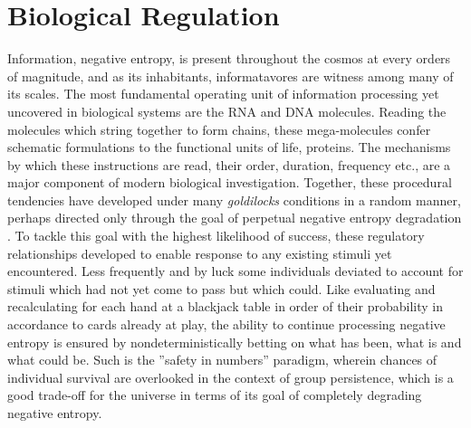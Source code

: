 
\section{Biological Regulation}
\label{sec:bioreg}
Information, \ie negative entropy, is present throughout the cosmos at every orders of magnitude, and as its inhabitants, informatavores are witness among many of its scales. The most fundamental operating unit of information processing yet uncovered in biological systems are the RNA and DNA molecules. Reading the molecules which string together to form chains, these mega-molecules confer schematic formulations to the functional units of life, proteins. The mechanisms by which these instructions are read, \ie their order, duration, frequency etc., are a major component of modern biological investigation. Together, these procedural tendencies have developed under many \emph{goldilocks} conditions in a random manner, perhaps directed only through the goal of perpetual negative entropy degradation \citep{england2013statistical}. To tackle this goal with the highest likelihood of success, these regulatory relationships developed to enable response to any existing stimuli yet encountered. Less frequently and by luck some individuals deviated to account for stimuli which had not yet come to pass but which could. Like evaluating and recalculating for each hand at a blackjack table in order of their probability in accordance to cards already at play, the ability to continue processing negative entropy is ensured by nondeterministically betting on what has been, what is and what could be. Such is the ''safety in numbers'' paradigm, wherein chances of individual survival are overlooked in the context of group persistence, which is a good trade-off for the universe in terms of its goal of completely degrading negative entropy.

